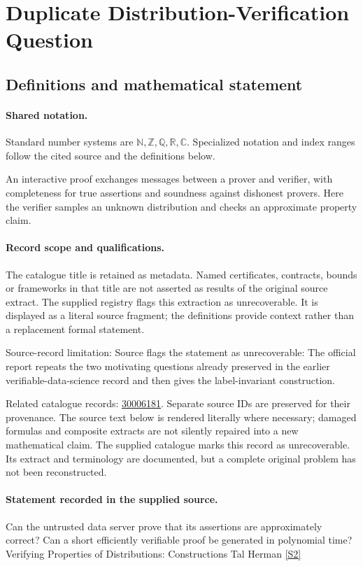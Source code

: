 \documentclass[11pt]{article}
\newcommand{\sref}[2]{\hyperlink{source:#1:#2}{[S#2]}}
\begin{document}
\section{Duplicate Distribution-Verification Question}\label{statement}

\subsection{Definitions and mathematical statement}

\paragraph{Shared notation.}Standard number systems are $\mathbb N,\mathbb Z,\mathbb Q,\mathbb R,\mathbb C$. Specialized notation and index ranges follow the cited source and the definitions below.


An interactive proof exchanges messages between a prover and verifier, with completeness for true assertions and soundness against dishonest provers. Here the verifier samples an unknown distribution and checks an approximate property claim.
\paragraph{Record scope and qualifications.}
The catalogue title is retained as metadata. Named certificates, contracts, bounds or frameworks in that title are not asserted as results of the original source extract.
The supplied registry flags this extraction as unrecoverable. It is displayed as a literal source fragment; the definitions provide context rather than a replacement formal statement.

Source-record limitation: Source flags the statement as unrecoverable: The official report repeats the two motivating questions already preserved in the earlier verifiable-data-science record and then gives the label-invariant construction.

Related catalogue records: \href{https://mehmetmars7.github.io/Erdosproblems-llm-hunter/problem.html?type=open_problems&id=30006181}{30006181}. Separate source IDs are preserved for their provenance.
The source text below is rendered literally where necessary; damaged formulas and composite extracts are not silently repaired into a new mathematical claim.
The supplied catalogue marks this record as unrecoverable. Its extract and terminology are documented, but a complete original problem has not been reconstructed.
\paragraph{Statement recorded in the supplied source.}
Can the untrusted data server prove that its assertions are approximately correct? Can a short efficiently verifiable proof be generated in polynomial time? Verifying Properties of Distributions: Constructions Tal Herman \sref{statement}{2}
\end{document}

